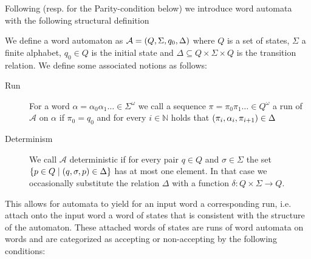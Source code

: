 \label{sec:wordautomata}
Following \cite{LangAutoLog} (resp. \cite[Chapter 1]{AutoLogInfGames} for the
Parity-condition below) we introduce word automata with the following
structural definition
\begin{definition}
  We define a word automaton as
  $\mathcal{A} = \left(Q, \Sigma, q_{0}, \Delta\right)$ where
  $Q$ is a set of states, $\Sigma$ a finite alphabet, $q_{0}\in Q$ is the
  initial state and $\Delta\subseteq Q\times\Sigma\times Q$ is the transition
  relation. We define some associated notions as follows:
  \begin{description}
    \item [Run]
      For a word $\alpha = \alpha_{0}\alpha_{1}\dots\in\Sigma^{\omega}$ we call
      a sequence $\pi = \pi_{0}\pi_{1}\dots \in Q^{\omega}$ a run of
      $\mathcal{A}$ on $\alpha$ if $\pi_{0} = q_{0}$ and for every
      $i\in\mathbb{N}$ holds that
      $\left(\pi_{i}, \alpha_{i}, \pi_{i+1}\right)\in\Delta$
    \item [Determinism]
      We call $\mathcal{A}$ deterministic if for every pair $q\in Q$ and
      $\sigma\in\Sigma$ the set
      $\left\{p\in Q\mid\left(q,\sigma,p\right)\in\Delta\right\}$ has at most one
      element. In that case we occasionally substitute the relation $\Delta$ 
      with a function $\delta:Q\times\Sigma\rightarrow Q$.
  \end{description}
\end{definition}
This allows for automata to yield for an input word a corresponding run, i.e.
attach onto the input word a word of states that is consistent with the
structure of the automaton. These attached words of states are runs of word
automata on words and are categorized as accepting or non-accepting by the
following conditions:
